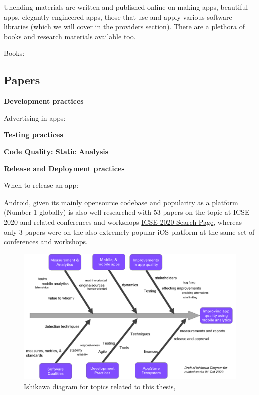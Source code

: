 Unending materials are written and published online on making apps, beautiful apps, elegantly engineered apps, those that use and apply various software libraries (which we will cover in the providers section). There are a plethora of books and research materials available too. 

Books:

\subsection{Papers}

\textbf{Development practices}

Advertising in apps: 

\textbf{Testing practices}

\textbf{Code Quality: Static Analysis}

\textbf{Release and Deployment practices}

When to release an app:

\clearpage

Android, given its mainly opensource codebase and popularity as a platform (Number 1 globally) is also well researched with 53 papers on the topic at ICSE 2020 and related conferences and workshops \href{https://conferences.computer.org/icse/#!/search}{ICSE 2020 Search Page}, whereas only 3 papers were on the also extremely popular iOS platform at the same set of conferences and workshops.

\begin{figure}[htbp!]
    \centering
    \includegraphics[width=15cm]{images/related-works-ishikawa-diagram-01-oct-2020.png}
    \caption{Ishikawa diagram for topics related to this thesis, }
    \label{fig:related_works_ishikawa_diagram}
\end{figure}

